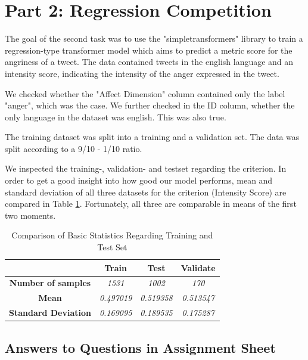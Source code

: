 \documentclass{article}
\newcommand\Tstrut{\rule{0pt}{2.6ex}}         %
\newcommand\Bstrut{\rule[-0.9ex]{0pt}{0pt}}   %
\begin{document}
\pagebreak
\section{Part 2: Regression Competition}

The goal of the second task was to use the "simpletransformers" library to train a regression-type transformer model which aims to predict a metric score for the angriness of a tweet. The data contained tweets in the english language and an intensity score, indicating the intensity of the anger expressed in the tweet. 

We checked whether the "Affect Dimension" column contained only the label "anger", which was the case. We further checked in the ID column, whether the only language in the dataset was english. This was also true.

The training dataset was split into a training and a validation set. The data was split according to a 9/10 - 1/10 ratio. 

We inspected the training-, validation- and testset regarding the criterion. In order to get a good insight into how good our model performs, mean and standard deviation of all three datasets for the criterion (Intensity Score) are compared in Table \ref{tab:dfs_stats}. Fortunately, all three are comparable in means of the first two moments.

\begin{table}[h!]
    \centering
    \begin{tabular}{c|ccc}
    \multicolumn{1}{l|}{}                  & \textbf{Train} &        \textbf{Test} & \textbf{Validate} \Tstrut\Bstrut \\ \hline
    \textbf{Number of samples}                   & \textit{1531}    & \textit{1002}  & \textit{170} \Tstrut\Bstrut    \\
    \textbf{Mean}                     & \textit{0.497019}    & \textit{0.519358} & \textit{0.513547}\Tstrut\Bstrut   \\
    \textbf{Standard Deviation} & \textit{0.169095}    & \textit{0.189535} & \textit{0.175287} \Tstrut\Bstrut  
    \end{tabular}
\caption{Comparison of Basic Statistics Regarding Training and Test Set}
\label{tab:dfs_stats}
\end{table}

\subsection{Answers to Questions in Assignment Sheet}
\end{document}
